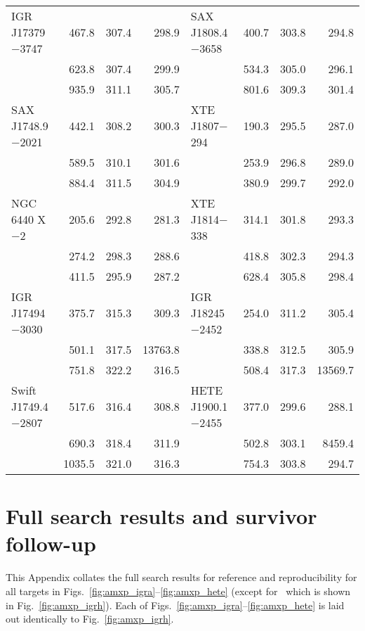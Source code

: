 \begin{subappendices}
\begin{table*}
{\begin{tabular}{l d{4} d{2} d{2} l d{4} d{2}  d{2}}
IGR J17379$-$3747	& 467.8		& 307.4 & 298.9 	 &  SAX J1808.4$-$3658	& 400.7		& 303.8 & 294.8 	\\ 
 					& 623.8		& 307.4 & 299.9 	 &  					& 534.3		& 305.0 & 296.1 	\\ 
 					& 935.9		& 311.1 & 305.7 	 &  					& 801.6		& 309.3 & 301.4 	\\ 
SAX J1748.9$-$2021	& 442.1		& 308.2 & 300.3 	 &  XTE J1807$-$294		& 190.3		& 295.5 & 287.0 	\\ 
					& 589.5		& 310.1 & 301.6 	 &  					& 253.9		& 296.8 & 289.0 	\\ 
					& 884.4		& 311.5 & 304.9 	 &  					& 380.9		& 299.7 & 292.0 	\\ 
NGC 6440 X$-$2		& 205.6		& 292.8 & 281.3      &  XTE J1814$-$338		& 314.1		& 301.8 & 293.3 	\\ 
					& 274.2		& 298.3 & 288.6 	 &  					& 418.8		& 302.3 & 294.3 	\\ 
					& 411.5		& 295.9 & 287.2 	 &  					& 628.4		& 305.8 & 298.4 	\\ 
IGR J17494$-$3030	& 375.7		& 315.3 & 309.3 	 &  IGR J18245$-$2452	& 254.0		& 311.2 & 305.4 	\\ 
 					& 501.1		& 317.5 & 13763.8 	 &   					& 338.8		& 312.5 & 305.9 	\\ 
 					& 751.8		& 322.2 & 316.5 	 &   					& 508.4		& 317.3 & 13569.7 	\\ 
Swift J1749.4$-$2807& 517.6		& 316.4 & 308.8      &  HETE J1900.1$-$2455	& 377.0		& 299.6 & 288.1 	\\ 
					& 690.3		& 318.4 & 311.9 	 &   					& 502.8		& 303.1 & 8459.4 	\\ 
					& 1035.5	& 321.0 & 316.3 	 &   					& 754.3		& 303.8 & 294.7 	\\                                                                                           
\bottomrule
\end{tabular}
}
\end{table*}

\section{ \label{app:amxp_fullresults} Full search results and survivor follow-up}
This Appendix collates the full search results for reference and reproducibility for all targets in Figs.~\ref{fig:amxp_igra}--\ref{fig:amxp_hete} (except for \igrh\ which is shown in Fig.~\ref{fig:amxp_igrh}). Each of Figs.~\ref{fig:amxp_igra}--\ref{fig:amxp_hete} is laid out identically to Fig.~\ref{fig:amxp_igrh}. 


\end{subappendices}
